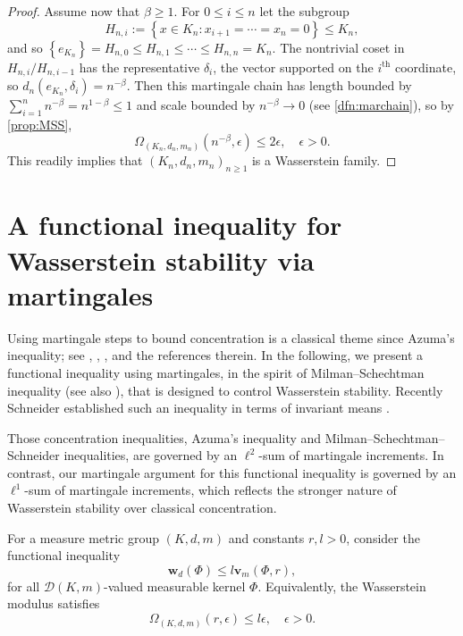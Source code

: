 \documentclass{amsart}
\numberwithin{equation}{subsection}
\theoremstyle{plain}
\theoremstyle{definition}
\theoremstyle{plain}
\begin{document}
\begin{proof}
\smallskip

Assume now that \(\beta\geq1\). For \(0\leq i\leq n\) let the subgroup
\[H_{n,i}:=\left\{x\in K_{n}:x_{i+1}=\dotsm=x_{n}=0\right\}\leq K_{n},\]
and so \(\left\{e_{K_{n}}\right\}=H_{n,0}\leq H_{n,1}\leq\dotsm\leq H_{n,n}=K_{n}\). The nontrivial coset in \(H_{n,i}/H_{n,i-1}\) has the representative \(\delta_{i}\), the vector supported on the \(i^{\mathrm{th}}\) coordinate, so \(d_{n}\left(e_{K_{n}},\delta_{i}\right)=n^{-\beta}\). Then this martingale chain has length bounded by \(\sum_{i=1}^{n}n^{-\beta}=n^{1-\beta}\leq1\) and scale bounded by \(n^{-\beta}\to0\) (see \cref{dfn:marchain}), so by \cref{prop:MSS},
\[\Omega_{\left(K_{n},d_{n},m_{n}\right)}\left(n^{-\beta},\epsilon\right)\leq2\epsilon,\quad\epsilon>0.\]
This readily implies that \(\left(K_{n},d_{n},m_{n}\right)_{n\geq1}\) is a Wasserstein family.
\end{proof}

\section{A functional inequality for Wasserstein stability via martingales}\label{sct:stabineq}

Using martingale steps to bound concentration is a classical theme since Azuma's inequality; see \cite[\S4.B.1]{milman1988heritage}, \cite[\S4]{talagrand1996new}, \cite[\S4.3]{Pestov2006}, \cite[\S3.2]{vanHandel2016} and the references therein. In the following, we present a functional inequality using martingales, in the spirit of Milman--Schechtman inequality \cite[I, Thm.~7.12]{milman1986asymptotic} (see also \cite[Thm.~4.5.3]{Pestov2006}), that is designed to control Wasserstein stability. Recently Schneider established such an inequality in terms of invariant means \cite[Thm.~1.1, Cor.~4.9]{schneider2023concentration}.

\smallskip

Those concentration inequalities, Azuma's inequality and Milman--Schechtman--Schneider inequalities, are governed by an \(\ell^{2}\)-sum of martingale increments. In contrast, our martingale argument for this functional inequality is governed by an \(\ell^{1}\)-sum of martingale increments, which reflects the stronger nature of Wasserstein stability over classical concentration.

\smallskip

For a measure metric group \(\left(K,d,m\right)\) and constants \(r,l>0\), consider the functional inequality
\begin{equation}\label{eq:funineq}\tag{\(\lozenge\)}
\mathbf{w}_{d}\left(\Phi\right)\leq l\mathbf{v}_{m}\left(\Phi,r\right),
\end{equation}
for all \(\mathcal{D}\left(K,m\right)\)-valued measurable kernel \(\Phi\). Equivalently, the Wasserstein modulus satisfies
\[\Omega_{\left(K,d,m\right)}\left(r,\epsilon\right)\leq l\epsilon,\quad\epsilon>0.\]
\end{document}

